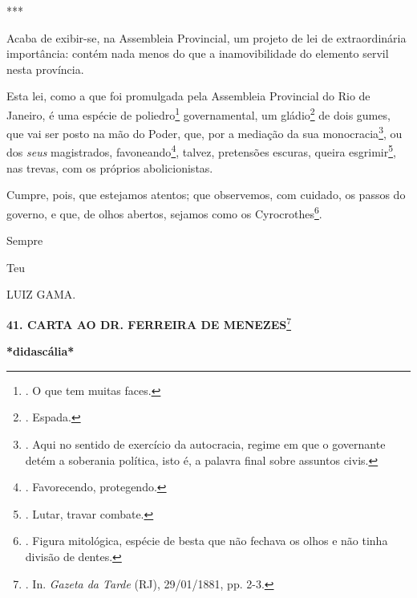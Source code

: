 ***

Acaba de exibir-se, na Assembleia Provincial, um projeto de lei de
extraordinária importância: contém nada menos do que a inamovibilidade
do elemento servil nesta província.

Esta lei, como a que foi promulgada pela Assembleia Provincial do Rio de
Janeiro, é uma espécie de poliedro\footnote{. O que tem muitas faces.}
governamental, um gládio\footnote{. Espada.} de dois gumes, que vai ser
posto na mão do Poder, que, por a mediação da sua monocracia\footnote{.
  Aqui no sentido de exercício da autocracia, regime em que o governante
  detém a soberania política, isto é, a palavra final sobre assuntos
  civis.}, ou dos \emph{seus} magistrados, favoneando\footnote{.
  Favorecendo, protegendo.}, talvez, pretensões escuras, queira
esgrimir\footnote{. Lutar, travar combate.}, nas trevas, com os próprios
abolicionistas.

Cumpre, pois, que estejamos atentos; que observemos, com cuidado, os
passos do governo, e que, de olhos abertos, sejamos como os
Cyrocrothes\footnote{. Figura mitológica, espécie de besta que não
  fechava os olhos e não tinha divisão de dentes.}.

Sempre

Teu

LUIZ GAMA.

\textbf{41. CARTA AO DR. FERREIRA DE MENEZES}\footnote{. In.
  \emph{Gazeta da Tarde} (RJ), 29/01/1881, pp. 2-3.}

\textbf{*didascália*}


